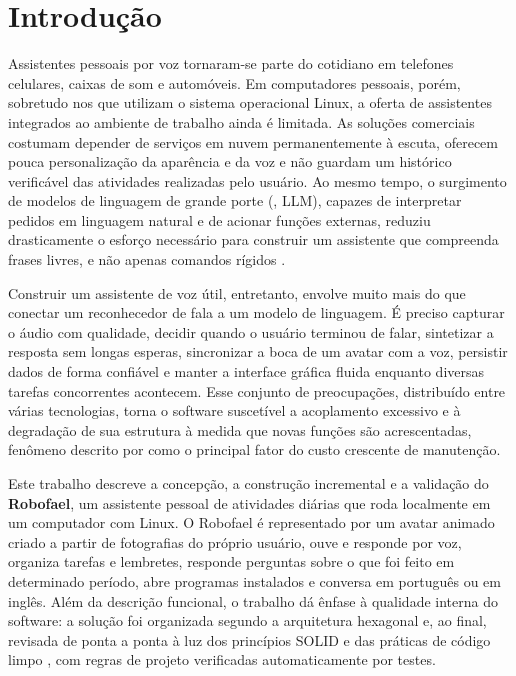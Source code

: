 \chapter{Introdução}

Assistentes pessoais por voz tornaram-se parte do cotidiano em telefones celulares, caixas de som
e automóveis. Em computadores pessoais, porém, sobretudo nos que utilizam o sistema operacional
Linux, a oferta de assistentes integrados ao ambiente de trabalho ainda é limitada. As soluções
comerciais costumam depender de serviços em nuvem permanentemente à escuta, oferecem pouca
personalização da aparência e da voz e não guardam um histórico verificável das atividades
realizadas pelo usuário. Ao mesmo tempo, o surgimento de modelos de linguagem de grande porte
(, LLM), capazes de interpretar pedidos em linguagem natural e de acionar
funções externas, reduziu drasticamente o esforço necessário para construir um assistente que
compreenda frases livres, e não apenas comandos rígidos \cite{vaswani2017}.

Construir um assistente de voz útil, entretanto, envolve muito mais do que conectar um reconhecedor
de fala a um modelo de linguagem. É preciso capturar o áudio com qualidade, decidir quando o usuário
terminou de falar, sintetizar a resposta sem longas esperas, sincronizar a boca de um avatar com a
voz, persistir dados de forma confiável e manter a interface gráfica fluida enquanto diversas tarefas
concorrentes acontecem. Esse conjunto de preocupações, distribuído entre várias tecnologias, torna o
software suscetível a acoplamento excessivo e à degradação de sua estrutura à medida que novas
funções são acrescentadas, fenômeno descrito por \textcite{martin2019} como o principal fator do custo
crescente de manutenção.

Este trabalho descreve a concepção, a construção incremental e a validação do \textbf{Robofael}, um
assistente pessoal de atividades diárias que roda localmente em um computador com Linux. O Robofael
é representado por um avatar animado criado a partir de fotografias do próprio usuário, ouve e
responde por voz, organiza tarefas e lembretes, responde perguntas sobre o que foi feito em
determinado período, abre programas instalados e conversa em português ou em inglês. Além da
descrição funcional, o trabalho dá ênfase à qualidade interna do software: a solução foi organizada
segundo a arquitetura hexagonal \cite{cockburn2005} e, ao final, revisada de ponta a ponta à luz dos
princípios SOLID \cite{martin2003} e das práticas de código limpo \cite{martin2009}, com regras de
projeto verificadas automaticamente por testes.

